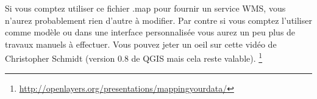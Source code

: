 Si vous comptez utiliser ce fichier .map pour fournir un service WMS, vous n'aurez probablement rien d'autre à modifier. Par contre si vous comptez l'utiliser comme modèle ou dans une interface personnalisée vous aurez un peu plus de travaux manuels à effectuer. Vous pouvez jeter un oeil sur cette vidéo de Christopher Schmidt (version 0.8 de QGIS mais cela reste valable).
\footnote{\url{http://openlayers.org/presentations/mappingyourdata/}}
